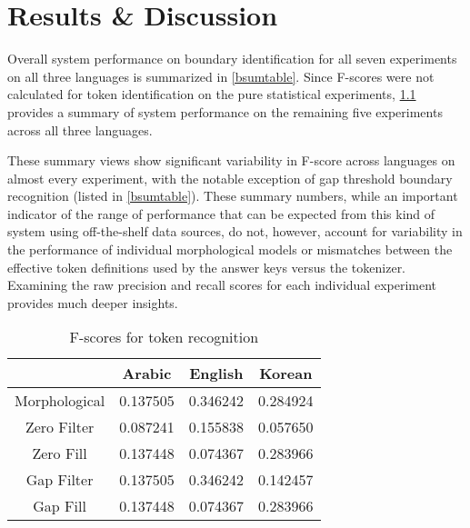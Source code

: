 \chapter{Results \& Discussion}
\FloatBarrier

Overall system performance on boundary identification for all seven experiments on all three languages is summarized in \ref{bsumtable}. Since F-scores were not calculated for token identification on the pure statistical experiments, \ref{tsumtable} provides a summary of system performance on the remaining five experiments across all three languages.

These summary views show significant variability in F-score across languages on almost every experiment, with the notable exception of gap threshold boundary recognition (listed in \ref{bsumtable}). These summary numbers, while an important indicator of the range of performance that can be expected from this kind of system using off-the-shelf data sources, do not, however, account for variability in the performance of individual morphological models or mismatches between the effective token definitions used by the answer keys versus the tokenizer. Examining the raw precision and recall scores for each individual experiment provides much deeper insights.

\begin{table}
	\centering
	\begin{tabular}{ | c | c | c | c |}
		\cline{2-4}
		\multicolumn{1}{c|}{} & Arabic & English & Korean \\ \hline
		Morphological & 0.137505 & 0.346242 & 0.284924 \\ \hline
		Zero Filter & 0.087241 & 0.155838 & 0.057650 \\ \hline
		Zero Fill & 0.137448 & 0.074367 & 0.283966 \\ \hline
		Gap Filter & 0.137505 & 0.346242 & 0.142457 \\ \hline
		Gap Fill & 0.137448 & 0.074367 & 0.283966 \\ \hline
	\end{tabular}
	\caption{F-scores for token recognition}
	\label{tsumtable}
\end{table}

